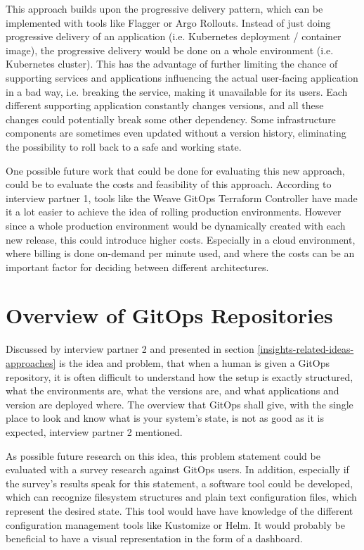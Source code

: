 This approach builds upon the progressive delivery pattern,
which can be implemented with tools like Flagger or Argo Rollouts.
Instead of just doing progressive delivery of an application (i.e. Kubernetes deployment / container image),
the progressive delivery would be done on a whole environment (i.e. Kubernetes cluster).
This has the advantage of further limiting the chance of supporting services and applications
influencing the actual user-facing application in a bad way, i.e. breaking the service, making it unavailable for its users.
Each different supporting application constantly changes versions, and all these changes could potentially break some other dependency.
Some infrastructure components are sometimes even updated without a version history,
eliminating the possibility to roll back to a safe and working state.

One possible future work that could be done for evaluating this new approach,
could be to evaluate the costs and feasibility of this approach.
According to interview partner 1, tools like the Weave GitOps Terraform Controller
have made it a lot easier to achieve the idea of rolling production environments.
However since a whole production environment would be dynamically created with each new release,
this could introduce higher costs.
Especially in a cloud environment, where billing is done on-demand per minute used,
and where the costs can be an important factor for deciding between different architectures.

\section*{Overview of GitOps Repositories}

Discussed by interview partner 2 and presented in section \ref{insights-related-ideas-approaches}
is the idea and problem, that when a human is given a GitOps repository,
it is often difficult to understand how the setup is exactly structured,
what the environments are,
what the versions are,
and what applications and version are deployed where.
The overview that GitOps shall give,
with the single place to look and know what is your system's state,
is not as good as it is expected,
interview partner 2 mentioned.

As possible future research on this idea,
this problem statement could be evaluated with a survey research against GitOps users.
In addition, especially if the survey's results speak for this statement,
a software tool could be developed,
which can recognize filesystem structures and plain text configuration files,
which represent the desired state.
This tool would have have knowledge of the different configuration management tools like Kustomize or Helm.
It would probably be beneficial to have a visual representation in the form of a dashboard.

